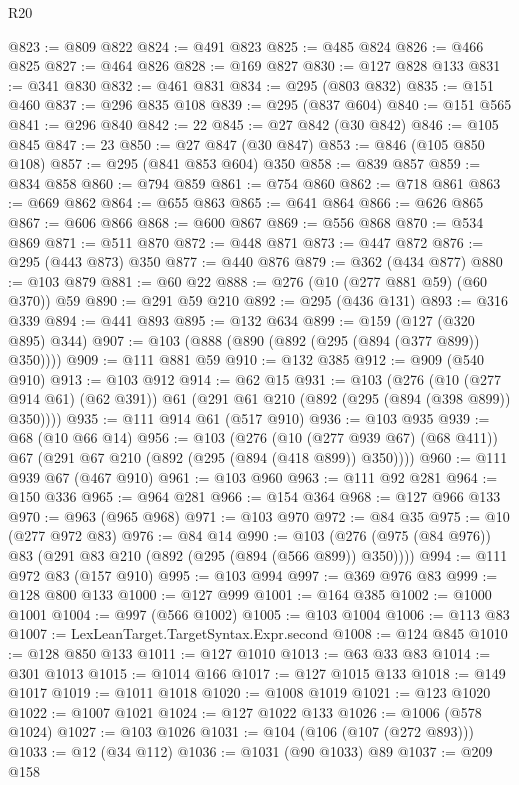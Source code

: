 \begin{lexlean}{R20}
\begin{coremodule}
@823 := @809 @822
@824 := @491 @823
@825 := @485 @824
@826 := @466 @825
@827 := @464 @826
@828 := @169 @827
@830 := @127 @828 @133
@831 := @341 @830
@832 := @461 @831
@834 := @295 (@803 @832)
@835 := @151 @460
@837 := @296 @835 @108
@839 := @295 (@837 @604)
@840 := @151 @565
@841 := @296 @840
@842 := 22
@845 := @27 @842 (@30 @842)
@846 := @105 @845
@847 := 23
@850 := @27 @847 (@30 @847)
@853 := @846 (@105 @850 @108)
@857 := @295 (@841 @853 @604) @350
@858 := @839 @857
@859 := @834 @858
@860 := @794 @859
@861 := @754 @860
@862 := @718 @861
@863 := @669 @862
@864 := @655 @863
@865 := @641 @864
@866 := @626 @865
@867 := @606 @866
@868 := @600 @867
@869 := @556 @868
@870 := @534 @869
@871 := @511 @870
@872 := @448 @871
@873 := @447 @872
@876 := @295 (@443 @873) @350
@877 := @440 @876
@879 := @362 (@434 @877)
@880 := @103 @879
@881 := @60 @22
@888 := @276 (@10 (@277 @881 @59) (@60 @370)) @59
@890 := @291 @59 @210
@892 := @295 (@436 @131)
@893 := @316 @339
@894 := @441 @893
@895 := @132 @634
@899 := @159 (@127 (@320 @895) @344)
@907 := @103 (@888 (@890 (@892 (@295 (@894 (@377 @899)) @350))))
@909 := @111 @881 @59
@910 := @132 @385
@912 := @909 (@540 @910)
@913 := @103 @912
@914 := @62 @15
@931 := @103
    (@276
      (@10 (@277 @914 @61) (@62 @391))
      @61
      (@291 @61 @210 (@892 (@295 (@894 (@398 @899)) @350))))
@935 := @111 @914 @61 (@517 @910)
@936 := @103 @935
@939 := @68 (@10 @66 @14)
@956 := @103
    (@276
      (@10 (@277 @939 @67) (@68 @411))
      @67
      (@291 @67 @210 (@892 (@295 (@894 (@418 @899)) @350))))
@960 := @111 @939 @67 (@467 @910)
@961 := @103 @960
@963 := @111 @92 @281
@964 := @150 @336
@965 := @964 @281
@966 := @154 @364
@968 := @127 @966 @133
@970 := @963 (@965 @968)
@971 := @103 @970
@972 := @84 @35
@975 := @10 (@277 @972 @83)
@976 := @84 @14
@990 := @103 (@276 (@975 (@84 @976)) @83 (@291 @83 @210 (@892 (@295 (@894 (@566 @899)) @350))))
@994 := @111 @972 @83 (@157 @910)
@995 := @103 @994
@997 := @369 @976 @83
@999 := @128 @800 @133
@1000 := @127 @999
@1001 := @164 @385
@1002 := @1000 @1001
@1004 := @997 (@566 @1002)
@1005 := @103 @1004
@1006 := @113 @83
@1007 := LexLeanTarget.TargetSyntax.Expr.second
@1008 := @124 @845
@1010 := @128 @850 @133
@1011 := @127 @1010
@1013 := @63 @33 @83
@1014 := @301 @1013
@1015 := @1014 @166
@1017 := @127 @1015 @133
@1018 := @149 @1017
@1019 := @1011 @1018
@1020 := @1008 @1019
@1021 := @123 @1020
@1022 := @1007 @1021
@1024 := @127 @1022 @133
@1026 := @1006 (@578 @1024)
@1027 := @103 @1026
@1031 := @104 (@106 (@107 (@272 @893)))
@1033 := @12 (@34 @112)
@1036 := @1031 (@90 @1033) @89
@1037 := @209 @158

\end{coremodule}
\end{lexlean}
